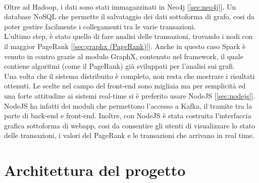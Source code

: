 \\Oltre ad Hadoop, i dati sono stati immagazzinati in Neo4j [\ref{sec:neo4j}]. Un database NoSQL che permette il salvataggio dei dati sottoforma di grafo, cosi da poter gestire facilmente i collegamenti tra le varie transazioni.
\\L'ultimo step, è stato quello di fare analisi delle transazioni, trovando i nodi con il maggior PageRank [\ref{sec:graphx (PageRank)}]. Anche in questo caso Spark è venuto in contro grazie al modulo GraphX, contenuto nel framework, il quale contiene algoritmi (come il PageRank) già sviluppati per l'analisi sui grafi.  
\\Una volta che il sistema distribuito è completo, non resta che mostrare i risultati ottenuti. Le scelte nel campo del front-end sono migliaia ma per semplicità ed una forte attitudine ai sistemi real-time si è preferito usare NodeJS [\ref{sec:nodejs}]. NodeJS ha infatti dei moduli che permettono l'accesso a Kafka, il tramite tra la parte di back-end e front-end. Inoltre, con NodeJS è stata costruita l'interfaccia grafica sottoforma di webapp, cosi da consentire gli utenti di visualizzare lo stato delle transazioni, i valori del PageRank e le transazioni che arrivano in real time.


\section{Architettura  del progetto}
\label{sec:architettura del progetto}




